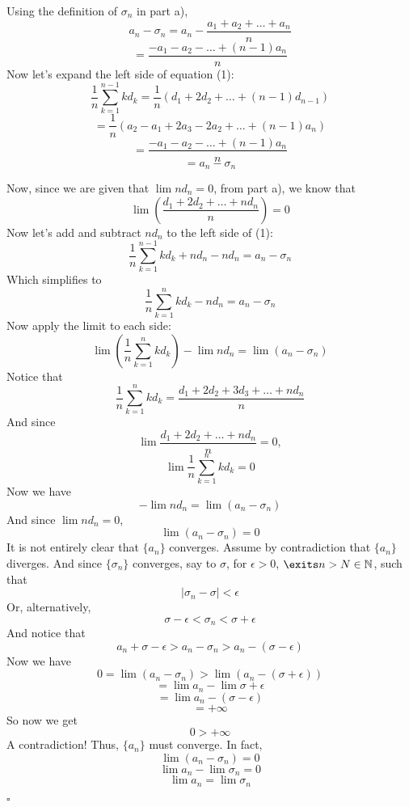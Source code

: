 \documentclass{article}
\begin{document}
Using the definition of $\sigma_n$ in part a),
\[a_n - \sigma_n = a_n - \frac{a_1 + a_2 + \ldots + a_n}{n}\]
\[ = \frac{-a_1 - a_2 - \ldots + (n-1)a_n}{n}\]
Now let's expand the left side of equation (1):
\[\frac{1}{n}\sum_{k=1}^{n-1}kd_k = \frac{1}{n}(d_1 + 2d_2 + \ldots + (n-1)d_{n-1})\]
\[ = \frac{1}{n}(a_2 - a_1 + 2a_3 - 2a_2 + \ldots + (n-1)a_{n})\]
\[ = \frac{-a_1 - a_2 - \ldots + (n-1)a_{n}}{n}\]
\[ = a_n - \sigma_n\]

Now, since we are given that $\lim{nd_n} = 0$, from part a), we know that 
\[\lim{(\frac{d_1+2d_2+\ldots+nd_n}{n})} = 0\]
Now let's add and subtract $nd_n$ to the left side of (1):
\[\frac{1}{n}\sum_{k=1}^{n-1}kd_k + nd_n - nd_n = a_n - \sigma_n\]
Which simplifies to 
\[\frac{1}{n}\sum_{k=1}^{n}kd_k - nd_n = a_n - \sigma_n\]
Now apply the limit to each side:
\[\lim{(\frac{1}{n}\sum_{k=1}^{n}kd_k)} - \lim{nd_n}= \lim{(a_n - \sigma_n)}\]
Notice that 
\[\frac{1}{n}\sum_{k=1}^{n}kd_k = \frac{d_1 + 2d_2 + 3d_3 + \ldots + nd_n}{n}\]
And since 
\[\lim{\frac{d_1 + 2d_2 + \ldots + nd_n}{n}} = 0,\]
\[\lim{\frac{1}{n}\sum_{k=1}^{n} kd_k} = 0 \]
Now we have
\[-\lim{nd_n} = \lim{(a_n - \sigma_n)}\]
And since $\lim{nd_n} = 0$,
\[\lim{(a_n - \sigma_n)} = 0\]
It is not entirely clear that $\{a_n\}$ converges. Assume by contradiction that $\{a_n\}$ diverges. And since $\{\sigma_n\}$ converges, say to $\sigma$, for $\epsilon > 0$,  $\exits n > N \in \mathbb{N}$, such that
\[|\sigma_n - \sigma| < \epsilon\]
Or, alternatively,
\[\sigma - \epsilon < \sigma_n < \sigma + \epsilon\]
And notice that 
\[a_n + \sigma - \epsilon > a_n - \sigma_n > a_n - (\sigma - \epsilon) \]
Now we have 
\[0 = \lim{(a_n - \sigma_n)} > \lim{(a_n - (\sigma +\epsilon))}\]
\[ = \lim{a_n} - \lim{\sigma + \epsilon}\]
\[ = \lim{a_n} - (\sigma - \epsilon)\]
\[ = + \infty\]
So now we get 
\[0 > +\infty\]
A contradiction! Thus, $\{a_n\}$ must converge. In fact,
\[\lim{(a_n - \sigma_n)} = 0\]
\[\lim{a_n} - \lim{\sigma_n} = 0\]
\[\lim{a_n} = \lim{\sigma_n}\]
\begin{flushright}
    $\square$
\end{flushright}
\end{document}
